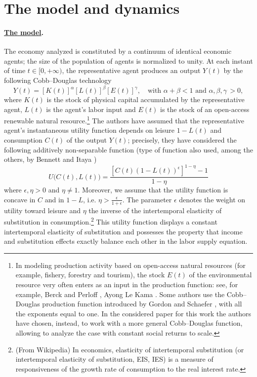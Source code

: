 \section{The model and dynamics}\label{Sec:model_dyn}
\paragraph{\underline{The model}.}
The economy analyzed is constituted by a continuum of identical economic agents; the size of the population of agents is normalized to unity. At each instant of time $t \in [0,+\infty)$, the representative agent produces an output $Y(t)$ by the following Cobb–Douglas technology
$$Y(t) = [K(t)]^\alpha[L(t)]^\beta[E(t)]^\gamma,\quad \text{with}\,\, \alpha+\beta<1\,\,  \text{and}\,\, \alpha, \beta, \gamma \,>0,$$
where $K(t)$ is the stock of physical capital accumulated by the representative agent, $L(t)$ is the agent’s labor input and $E(t)$ is the stock of an open-access renewable natural resource.\footnote{In modeling production activity based on open-access natural resources (for example, fishery, forestry and tourism), the stock $E(t)$ of the environmental resource very often enters as an input in the production function: see, for example, Berck and Perloff \cite{berck_open-access_1984}, Ayong Le Kama \cite{ayong_le_kama_sustainable_2001}. Some authors use the Cobb–Douglas production function introduced by Gordon \cite{gordon_economic_1954} and Schaefer \cite{schaefer_considerations_2019}, with all the exponents equal to one. In the considered paper for this work the authors have chosen, instead, to work with a more general Cobb–Douglas function, allowing to analyze the case with constant social returns to scale.}
The authors have assumed that the representative agent’s instantaneous utility function depends on leisure $1-L(t)$ and consumption $C(t)$ of the output $Y(t)$; precisely, they have considered the following additively non-separable function (type of function also used, among the others, by Bennett \cite{bennett_indeterminacy_2000} and Itaya \cite{itaya_can_2008})
$$U\Big(C(t), L(t)\Big)=\frac{[C(t)(1-L(t))^{\epsilon}]^{1-\eta} -1}{1-\eta}$$
where $\epsilon,\eta>0$ and $\eta \neq 1$. Moreover, we assume that the utility function is concave in $C$ and in $1-L$, i.e. $\eta > \frac{\epsilon}{1+\epsilon}$. The parameter $\epsilon$ denotes the weight on utility toward leisure and $\eta$ the inverse of the intertemporal elasticity of substitution in consumption.\footnote{(From Wikipedia) In economics, elasticity of intertemporal substitution (or intertemporal elasticity of substitution, EIS, IES) is a measure of responsiveness of the growth rate of consumption to the real interest rate.} This utility function displays a constant intertemporal elasticity of substitution and possesses the property that income and substitution effects exactly balance each other in the labor supply equation. 

